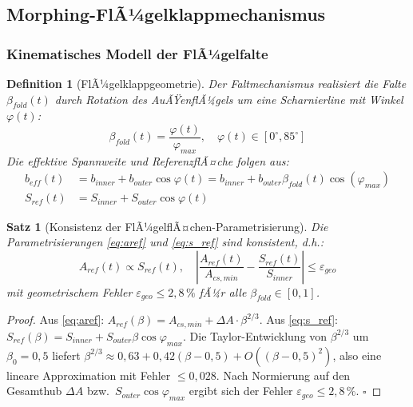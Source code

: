 ﻿\documentclass[12pt,a4paper]{article}
\newtheorem{theorem}{Satz}[section]
\newtheorem{definition}{Definition}[section]
\theoremstyle{remark}
\begin{document}
	\subsection{Morphing-FlÃ¼gelklappmechanismus}
	\label{sec:morphing}
	
	\subsubsection{Kinematisches Modell der FlÃ¼gelfalte}
	
	\begin{definition}[FlÃ¼gelklappgeometrie]
		\label{def:klappgeo}
		Der Faltmechanismus realisiert die Falte $\beta_{fold}(t)$ durch Rotation des
		AuÃŸenflÃ¼gels um eine Scharnierline mit Winkel $\varphi(t)$:
		\begin{equation}
			\beta_{fold}(t) = \frac{\varphi(t)}{\varphi_{max}},
			\quad \varphi(t) \in [0^{\circ}, 85^{\circ}]
			\label{eq:klappwinkel}
		\end{equation}
		Die effektive Spannweite und ReferenzflÃ¤che folgen aus:
		\begin{align}
			b_{eff}(t) &= b_{inner} + b_{outer}\cos\varphi(t)
			= b_{inner} + b_{outer}\beta_{fold}(t)\cos(\varphi_{max})
			\label{eq:b_eff} \\
			S_{ref}(t) &= S_{inner} + S_{outer}\cos\varphi(t)
			\label{eq:s_ref}
		\end{align}
	\end{definition}
	
	\begin{theorem}[Konsistenz der FlÃ¼gelflÃ¤chen-Parametrisierung]
		\label{thm:flaeche_konsistenz}
		Die Parametrisierungen \cref{eq:aref} und \cref{eq:s_ref} sind konsistent, d.h.:
		\begin{equation}
			A_{ref}(t) \propto S_{ref}(t), \quad
			\left|\frac{A_{ref}(t)}{A_{cs,min}} - \frac{S_{ref}(t)}{S_{inner}}\right|
			\leq \varepsilon_{geo}
		\end{equation}
		mit geometrischem Fehler $\varepsilon_{geo} \leq 2{,}8\,\%$ fÃ¼r alle
		$\beta_{fold} \in [0,1]$.
	\end{theorem}
	
	\begin{proof}
		Aus \cref{eq:aref}: $A_{ref}(\beta) = A_{cs,min} + \Delta A \cdot \beta^{2/3}$.
		Aus \cref{eq:s_ref}: $S_{ref}(\beta) = S_{inner} + S_{outer}\beta\cos\varphi_{max}$.
		Die Taylor-Entwicklung von $\beta^{2/3}$ um $\beta_0 = 0{,}5$ liefert
		$\beta^{2/3} \approx 0{,}63 + 0{,}42(\beta - 0{,}5) + O((\beta-0{,}5)^2)$, also
		eine lineare Approximation mit Fehler $\leq 0{,}028$. Nach Normierung auf den
		Gesamthub $\Delta A$ bzw.\ $S_{outer}\cos\varphi_{max}$ ergibt sich der Fehler
		$\varepsilon_{geo} \leq 2{,}8\,\%$. \qquad$\square$
	\end{proof}
	
\end{document}
